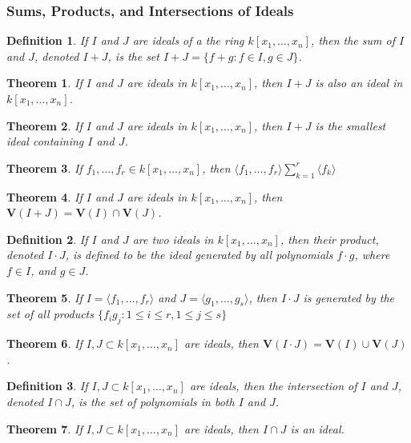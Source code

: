 \documentclass{article}
\theoremstyle{mystyle}
\newtheorem{theorem}{Theorem}[section]
\newtheorem{definition}{Definition}[section]
\begin{document}
\subsubsection{Sums, Products, and Intersections of Ideals}
\begin{definition}
If $I$ and $J$ are ideals of a the ring $k[x_1,\hdots ,x_n]$, then the sum of $I$ and $J$, denoted $I+J$, is the set $I+J = \{f+g: f\in I, g\in J\}$.
\end{definition}
\begin{theorem}
If $I$ and $J$ are ideals in $k[x_1,\hdots ,x_n]$, then $I+J$ is also an ideal in $k[x_1,\hdots ,x_n]$.
\end{theorem}
\begin{theorem}
If $I$ and $J$ are ideals in $k[x_1,\hdots ,x_n]$, then $I+J$ is the smallest ideal containing $I$ and $J$.
\end{theorem}
\begin{theorem}
If $f_1,\hdots, f_r \in k[x_1,\hdots ,x_n]$, then $\langle f_1,\hdots, f_r\rangle \sum_{k=1}^{r} \langle f_k\rangle$
\end{theorem}
\begin{theorem}
If $I$ and $J$ are ideals in $k[x_1,\hdots ,x_n]$, then $\mathbf{V}(I+J) = \mathbf{V}(I) \cap \mathbf{V}(J)$.
\end{theorem}
\begin{definition}
If $I$ and $J$ are two ideals in $k[x_1,\hdots ,x_n]$, then their product, denoted $I\cdot J$, is defined to be the ideal generated by all polynomials $f\cdot g$, where $f\in I$, and $g\in J$.
\end{definition}
\begin{theorem}
If $I = \langle f_1,\hdots, f_r\rangle$ and $J = \langle g_1,\hdots, g_s\rangle$, then $I \cdot J$ is generated by the set of all products $\{f_ig_j:1\leq i\leq r, 1\leq j \leq s\}$
\end{theorem}
\begin{theorem}
If $I,J\subset k[x_1,\hdots ,x_n]$ are ideals, then $\mathbf{V}(I\cdot J) = \mathbf{V}(I)\cup \mathbf{V}(J)$.
\end{theorem}
\begin{definition}
If $I,J\subset k[x_1,\hdots ,x_n]$ are ideals, then the intersection of $I$ and $J$, denoted $I\cap J$, is the set of polynomials in both $I$ and $J$.
\end{definition}
\begin{theorem}
If $I,J\subset k[x_1,\hdots ,x_n]$ are ideals, then $I\cap J$ is an ideal.
\end{theorem}
\end{document}
